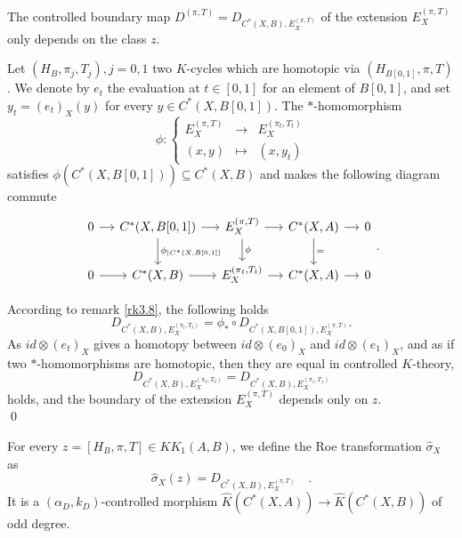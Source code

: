 \begin{prop}
The controlled boundary map $D^{(\pi,T)}=D_{C^*(X,B),E_X^{(\pi,T)}}$ of the extension $E_X^{(\pi,T)}$ only depends on the class $z$.
\end{prop}

\begin{dem}
Let $(H_B, \pi_j,T_j), j=0,1$ two $K$-cycles which are homotopic via $(H_{B[0,1]},\pi,T)$. We denote by $e_t$ the evaluation at $t\in[0,1]$ for an element of $B[0,1]$, and set $y_t=(e_t)_X(y)$ for every $y\in C^*(X,B[0,1])$. The $*$-homomorphism
\[\phi : \left\{\begin{array}{lll}E_X^{(\pi,T)} & \rightarrow & E_X^{(\pi_t,T_t)} \\ (x,y) & \mapsto & (x, y_t)\end{array}\right.\]
satisfies $\phi(C^*(X,B[0,1]))\subseteq C^*(X,B)$ and makes the following diagram commute
\[\begin{tikzcd}[column sep = small]
0\arrow{r} & C^*(X,B[0,1])\arrow{r}\arrow{d}{\phi_{|C^*(X,B[0,1])}} & E_X^{(\pi,T)} \arrow{r}\arrow{d}{\phi} & C^*(X,A)\arrow{r}\arrow{d}{=}& 0 \\
0\arrow{r} & C^*(X,B)\arrow{r} &  E_X^{(\pi_t,T_t)} \arrow{r} & C^*(X,A) \arrow{r} & 0
\end{tikzcd}.\]

According to remark \ref{rk3.8}, the following holds
\[D_{C^*(X,B),E_X^{(\pi_t,T_t)}} = \phi_* \circ D_{C^*(X,B[0,1]),E_X^{(\pi,T)}}.\]
As $id \otimes (e_t)_X$ gives a homotopy between $id\otimes (e_0)_X$ and $id\otimes (e_1)_X$, and as if two $*$-homomorphisms are homotopic, then they are equal in controlled $K$-theory, 
\[D_{C^*(X,B), E_X^{(\pi_0,T_0)}}=D_{C^*(X,B), E_X^{(\pi_1,T_1)}}\]
holds, and the boundary of the extension $E_X^{(\pi,T)}$ depends only on $z$.\\
\qed
\end{dem}

\begin{definition}
For every $z=[H_B,\pi,T]\in KK_1(A,B)$, we define the Roe transformation $\hat\sigma_X$ as 
\[\hat\sigma_X(z)= D_{C^*(X,B),E_X^{(\pi,T)}}\quad.\]
It is a $(\alpha_D,k_D)$-controlled morphism $\hat K(C^*(X,A))\rightarrow \hat K(C^*(X,B))$ of odd degree.
\end{definition}

